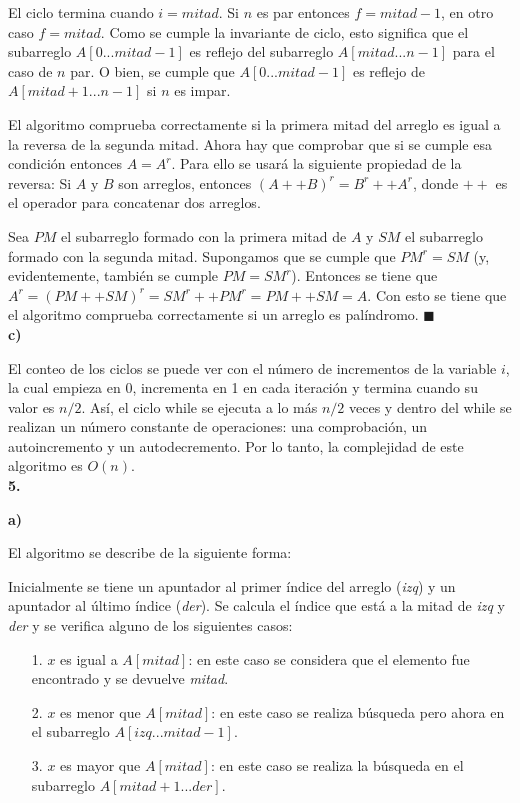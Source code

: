 \documentclass{article}
\begin{document}
El ciclo termina cuando $i = mitad$. Si $n$ es par entonces $f = mitad-1$, en otro caso $f = mitad$. Como se cumple la invariante de ciclo, esto significa que el subarreglo $A[0...mitad-1]$ es reflejo del subarreglo $A[mitad...n-1]$ para el caso de $n$ par. O bien, se cumple que $A[0...mitad-1]$ es reflejo de $A[mitad+1...n-1]$ si $n$ es impar.

El algoritmo comprueba correctamente si la primera mitad del arreglo es igual a la reversa de la segunda mitad. Ahora hay que comprobar que si se cumple esa condición entonces $A = A^r$. Para ello se usará la siguiente propiedad de la reversa: Si $A$ y $B$ son arreglos, entonces $(A++B)^r = B^r++A^r$, donde $++$ es el operador para  concatenar dos arreglos.

Sea $PM$ el subarreglo formado con la primera mitad de $A$ y $SM$ el subarreglo formado con la segunda mitad. Supongamos que se cumple que $PM^r = SM$ (y, evidentemente, también se cumple $PM = SM^r$). Entonces se tiene que $A^r = (PM++SM)^r = SM^r++PM^r = PM++SM = A$. Con esto se tiene que el algoritmo comprueba correctamente si un arreglo es palíndromo. $\blacksquare$\\

\textbf{c)}

El conteo de los ciclos se puede ver con el número de incrementos de la variable $i$, la cual empieza en 0, incrementa en 1 en cada iteración y termina cuando su valor es $n/2$. Así, el ciclo while se ejecuta a lo más $n/2$ veces y dentro del while se realizan un número constante de operaciones: una comprobación, un autoincremento y un autodecremento. Por lo tanto, la complejidad de este algoritmo es $O(n)$.\\

\textbf{5.}

\textbf{a)}

El algoritmo se describe de la siguiente forma:

Inicialmente se tiene un apuntador al primer índice del arreglo (\textit{izq}) y un apuntador al último índice (\textit{der}). Se calcula el índice que está a la mitad de \textit{izq} y \textit{der} y se verifica alguno de los siguientes casos:

\begin{itemize}
\item[1.] $x$ es igual a $A[mitad]$: en este caso se considera que el elemento fue encontrado y se devuelve \textit{mitad}.
\item[2.] $x$ es menor que $A[mitad]$: en este caso se realiza búsqueda pero ahora en el subarreglo $A[izq...mitad-1]$.
\item[3.] $x$ es mayor que $A[mitad]$: en este caso se realiza la búsqueda en el subarreglo $A[mitad+1...der]$.
\end{itemize}
\end{document}
